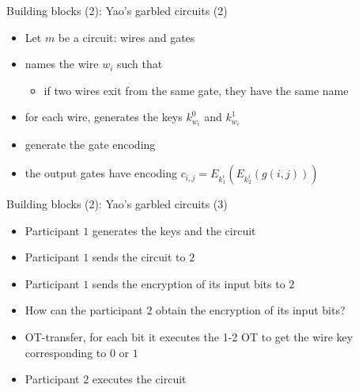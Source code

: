 \documentclass{beamer}
\begin{document}

\begin{frame}{Building blocks (2): Yao's garbled circuits (2)}
  \begin{itemize}
  \item Let $m$ be a circuit: wires and gates
  \item names the wire $w_i$ such that
  \begin{itemize}
    \item if two wires exit from the same gate, they have the same name
  \end{itemize}
  \item for each wire, generates the keys $k^0_{w_i}$ and $k^1_{w_i}$
  \item generate the gate encoding
  \item the output gates have encoding $c_{i,j} =
    E_{k^i_1}(E_{k^i_2}(g(i,j)))$
  \end{itemize}
\end{frame}

\begin{frame}{Building blocks (2): Yao's garbled circuits (3)}
  \begin{itemize}
  \item Participant $1$ generates the keys and the circuit
  \item Participant $1$ sends the circuit to $2$
  \item Participant $1$ sends the encryption of its input bits to $2$
  \item How can the participant $2$ obtain the encryption of its input
    bits?
  \item<2-> OT-transfer, for each bit it executes the 1-2 OT to get
    the wire key corresponding to $0$ or $1$
  \item<3-> Participant $2$ executes the circuit
  \end{itemize}
\end{frame}
\end{document}
